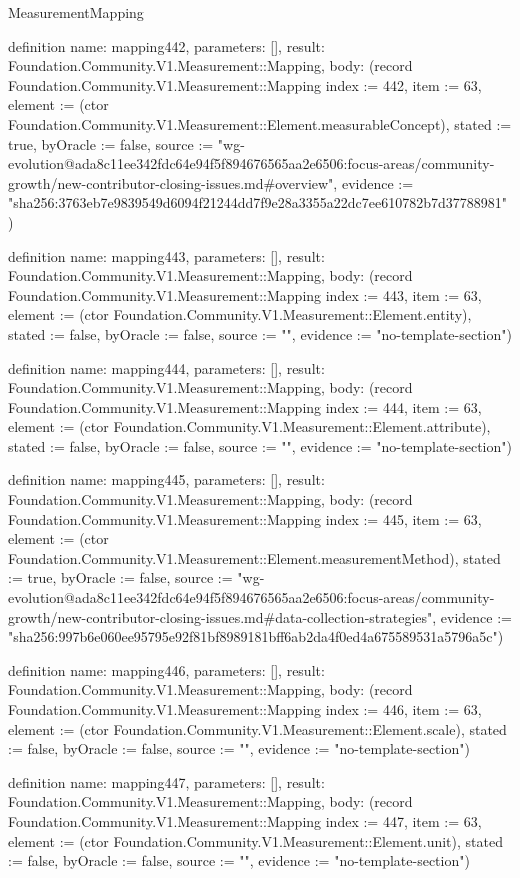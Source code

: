 \begin{lexlean}{MeasurementMapping}
\begin{semanticmodule}
definition{
  name: mapping442,
  parameters: [],
  result: Foundation.Community.V1.Measurement::Mapping,
  body: (record Foundation.Community.V1.Measurement::Mapping {index := 442, item := 63, element := (ctor Foundation.Community.V1.Measurement::Element.measurableConcept), stated := true, byOracle := false, source := "wg-evolution@ada8c11ee342fdc64e94f5f894676565aa2e6506:focus-areas/community-growth/new-contributor-closing-issues.md#overview", evidence := "sha256:3763eb7e9839549d6094f21244dd7f9e28a3355a22dc7ee610782b7d37788981"})
}

definition{
  name: mapping443,
  parameters: [],
  result: Foundation.Community.V1.Measurement::Mapping,
  body: (record Foundation.Community.V1.Measurement::Mapping {index := 443, item := 63, element := (ctor Foundation.Community.V1.Measurement::Element.entity), stated := false, byOracle := false, source := "", evidence := "no-template-section"})
}

definition{
  name: mapping444,
  parameters: [],
  result: Foundation.Community.V1.Measurement::Mapping,
  body: (record Foundation.Community.V1.Measurement::Mapping {index := 444, item := 63, element := (ctor Foundation.Community.V1.Measurement::Element.attribute), stated := false, byOracle := false, source := "", evidence := "no-template-section"})
}

definition{
  name: mapping445,
  parameters: [],
  result: Foundation.Community.V1.Measurement::Mapping,
  body: (record Foundation.Community.V1.Measurement::Mapping {index := 445, item := 63, element := (ctor Foundation.Community.V1.Measurement::Element.measurementMethod), stated := true, byOracle := false, source := "wg-evolution@ada8c11ee342fdc64e94f5f894676565aa2e6506:focus-areas/community-growth/new-contributor-closing-issues.md#data-collection-strategies", evidence := "sha256:997b6e060ee95795e92f81bf8989181bff6ab2da4f0ed4a675589531a5796a5c"})
}

definition{
  name: mapping446,
  parameters: [],
  result: Foundation.Community.V1.Measurement::Mapping,
  body: (record Foundation.Community.V1.Measurement::Mapping {index := 446, item := 63, element := (ctor Foundation.Community.V1.Measurement::Element.scale), stated := false, byOracle := false, source := "", evidence := "no-template-section"})
}

definition{
  name: mapping447,
  parameters: [],
  result: Foundation.Community.V1.Measurement::Mapping,
  body: (record Foundation.Community.V1.Measurement::Mapping {index := 447, item := 63, element := (ctor Foundation.Community.V1.Measurement::Element.unit), stated := false, byOracle := false, source := "", evidence := "no-template-section"})
}


\end{semanticmodule}
\end{lexlean}
